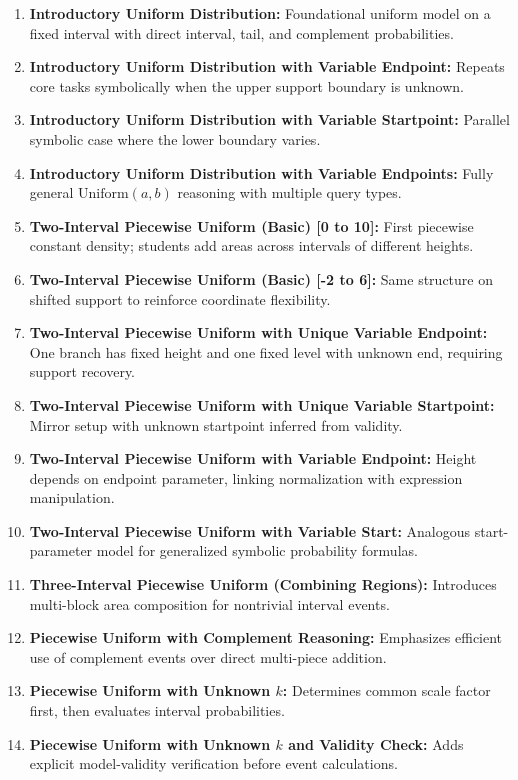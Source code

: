 \begin{enumerate}
  \item \textbf{Introductory Uniform Distribution:} Foundational uniform model on a fixed interval with direct interval, tail, and complement probabilities.
  \item \textbf{Introductory Uniform Distribution with Variable Endpoint:} Repeats core tasks symbolically when the upper support boundary is unknown.
  \item \textbf{Introductory Uniform Distribution with Variable Startpoint:} Parallel symbolic case where the lower boundary varies.
  \item \textbf{Introductory Uniform Distribution with Variable Endpoints:} Fully general \(\text{Uniform}(a,b)\) reasoning with multiple query types.
  \item \textbf{Two-Interval Piecewise Uniform (Basic) [0 to 10]:} First piecewise constant density; students add areas across intervals of different heights.
  \item \textbf{Two-Interval Piecewise Uniform (Basic) [-2 to 6]:} Same structure on shifted support to reinforce coordinate flexibility.
  \item \textbf{Two-Interval Piecewise Uniform with Unique Variable Endpoint:} One branch has fixed height and one fixed level with unknown end, requiring support recovery.
  \item \textbf{Two-Interval Piecewise Uniform with Unique Variable Startpoint:} Mirror setup with unknown startpoint inferred from validity.
  \item \textbf{Two-Interval Piecewise Uniform with Variable Endpoint:} Height depends on endpoint parameter, linking normalization with expression manipulation.
  \item \textbf{Two-Interval Piecewise Uniform with Variable Start:} Analogous start-parameter model for generalized symbolic probability formulas.
  \item \textbf{Three-Interval Piecewise Uniform (Combining Regions):} Introduces multi-block area composition for nontrivial interval events.
  \item \textbf{Piecewise Uniform with Complement Reasoning:} Emphasizes efficient use of complement events over direct multi-piece addition.
  \item \textbf{Piecewise Uniform with Unknown \(k\):} Determines common scale factor first, then evaluates interval probabilities.
  \item \textbf{Piecewise Uniform with Unknown \(k\) and Validity Check:} Adds explicit model-validity verification before event calculations.

\end{enumerate}
